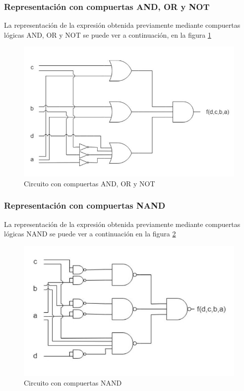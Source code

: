 \subsubsection{Representaci\'on con compuertas AND, OR y NOT}
\noindent
La representaci\'on de la expresi\'on obtenida previamente mediante compuertas l\'ogicas AND, OR y NOT se puede ver a continuaci\'on, en la figura \ref{fig:ej2b}

\begin{figure}[H]
    \centering
    \includegraphics[scale=0.55]{images/ej2/circuito1_ej2_parteb.JPG}
    \caption{Circuito con compuertas AND, OR y NOT}
    \label{fig:ej2b}
\end{figure}

\subsubsection{Representaci\'on con compuertas NAND}
\noindent
La representaci\'on de la expresi\'on obtenida previamente mediante compuertas l\'ogicas NAND se puede ver a continuaci\'on en la figura \ref{fig:ej2bnand}

\begin{figure}[H]
    \centering
    \includegraphics[scale=0.7]{images/ej2/circuito2_ej2_parteb.JPG}
    \caption{Circuito con compuertas NAND}
    \label{fig:ej2bnand}
\end{figure}\\